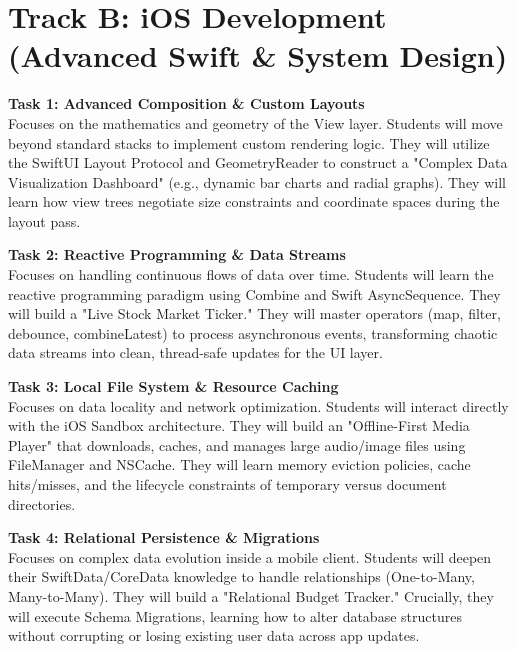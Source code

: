 \section*{Track B: iOS Development (Advanced Swift \& System Design)}

\noindent\textbf{Task 1: Advanced Composition \& Custom Layouts} \\
Focuses on the mathematics and geometry of the View layer. Students will move beyond standard stacks to implement custom rendering logic. They will utilize the SwiftUI Layout Protocol and GeometryReader to construct a "Complex Data Visualization Dashboard" (e.g., dynamic bar charts and radial graphs). They will learn how view trees negotiate size constraints and coordinate spaces during the layout pass.

\vspace{0.3cm}

\noindent\textbf{Task 2: Reactive Programming \& Data Streams} \\
Focuses on handling continuous flows of data over time. Students will learn the reactive programming paradigm using Combine and Swift AsyncSequence. They will build a "Live Stock Market Ticker." They will master operators (map, filter, debounce, combineLatest) to process asynchronous events, transforming chaotic data streams into clean, thread-safe updates for the UI layer.

\vspace{0.3cm}

\noindent\textbf{Task 3: Local File System \& Resource Caching} \\
Focuses on data locality and network optimization. Students will interact directly with the iOS Sandbox architecture. They will build an "Offline-First Media Player" that downloads, caches, and manages large audio/image files using FileManager and NSCache. They will learn memory eviction policies, cache hits/misses, and the lifecycle constraints of temporary versus document directories.

\vspace{0.3cm}

\noindent\textbf{Task 4: Relational Persistence \& Migrations} \\
Focuses on complex data evolution inside a mobile client. Students will deepen their SwiftData/CoreData knowledge to handle relationships (One-to-Many, Many-to-Many). They will build a "Relational Budget Tracker." Crucially, they will execute Schema Migrations, learning how to alter database structures without corrupting or losing existing user data across app updates.

